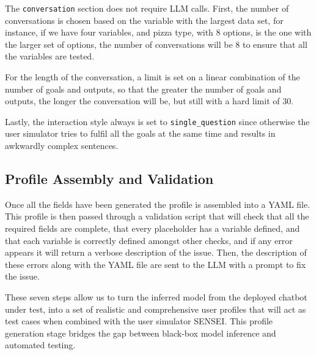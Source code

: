 The \texttt{conversation} section does not require \ac{LLM} calls.
First, the number of conversations is chosen
based on the variable with the largest data set,
for instance, if we have four variables,
and pizza type, with $8$ options, is the one with the larger set of options,
the number of conversations will be $8$ to ensure that all the variables are tested.

For the length of the conversation,
a limit is set on a linear combination
of the number of goals and outputs,
so that the greater the number of goals and outputs,
the longer the conversation will be,
but still with a hard limit of $30$.

Lastly, the interaction style always is set to \texttt{single\_question}
since otherwise the user simulator tries to
fulfil all the goals at the same time
and results in awkwardly complex sentences.

\subsection{Profile Assembly and Validation}

Once all the fields have been generated
the profile is assembled into a YAML file.
This profile is then passed through a validation script
that will check that all the required fields are complete,
that every placeholder has a variable defined,
and that each variable is correctly defined
amongst other checks,
and if any error appears it will return a verbose description of the issue.
Then, the description of these errors along with the YAML file
are sent to the \ac{LLM} with a prompt to fix the issue.


These seven steps allow us to turn the inferred model
from the deployed chatbot under test,
into a set of realistic and comprehensive user profiles
that will act as test cases when combined with the user simulator SENSEI.
This profile generation stage bridges the gap between
black-box model inference and automated testing.
